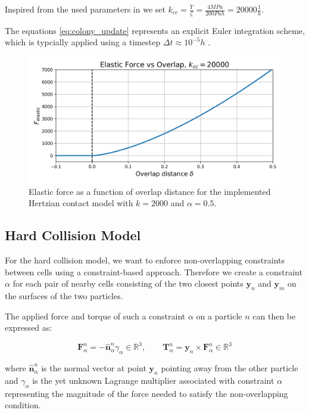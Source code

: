 \documentclass[conference]{IEEEtran}
\begin{document}
Inspired from the used parameters in \cite{You2018} we set $k_{cc} = \frac{Y}{\zeta} = \frac{4 MPa}{200 Pa h} = 20000 \frac{1}{h}$.


The equations \autoref{eq:colony_update} represents an explicit Euler integration scheme, which is typcially applied using  a timestep $\Delta t \approx 10^{-5} h$ \cite{Khan_2024}\cite{You2018}\cite{Blanchard2015}.


\begin{figure}[H]
    \centering
    \includegraphics[width=\linewidth]{figures/hertzian_contact_model.png}
    \caption{Elastic force as a function of overlap distance for the implemented Hertzian contact model with $k=2000$ and $\alpha=0.5$.}
    \label{fig:hertzian_contact_model}
\end{figure}

\newpage
\subsection{Hard Collision Model}


For the hard collision model, we want to enforce non-overlapping constraints between cells using a constraint-based approach. Therefore we create a constraint $\alpha$ for each pair of nearby cells consisting of the two closest points $\mathbf{y}_n$ and $\mathbf{y}_m$ on the surfaces of the two particles.

The applied force and torque of such a constraint $\alpha$ on a particle $n$ can then be expressed as:

$$
    \mathbf{F}_\alpha^n = - \hat{\mathbf{n}}_\alpha ^n \gamma_\alpha \in \mathbb{R}^3, \qquad \mathbf{T}_\alpha^n = \mathbf{y}_n \times \mathbf{F}_\alpha^n \in \mathbb{R}^3
$$
\label{eq:constraint_force}

where $\hat{\mathbf{n}}_\alpha ^n$ is the normal vector at point $\mathbf{y}_n$ pointing away from the other particle and $\gamma_\alpha$ is the yet unknown Lagrange multiplier associated with constraint $\alpha$ representing the magnitude of the force needed to satisfy the non-overlapping condition.
\end{document}
